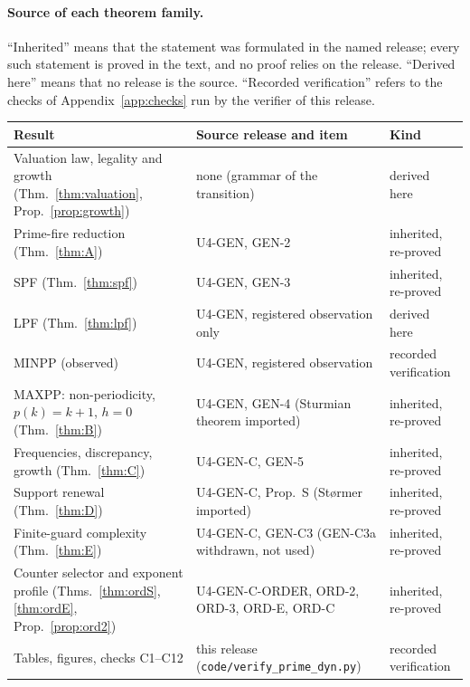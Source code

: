 \paragraph{Source of each theorem family.} ``Inherited'' means that the statement was formulated in the named release; every such statement is proved in the text, and no proof relies on the release. ``Derived here'' means that no release is the source. ``Recorded verification'' refers to the checks of Appendix~\ref{app:checks} run by the verifier of this release.
\begin{center}\scriptsize
\begin{tabular}{@{}p{}p{}p{}@{}}\toprule
Result & Source release and item & Kind\\\midrule
Valuation law, legality and growth (Thm.~\ref{thm:valuation}, Prop.~\ref{prop:growth}) & none (grammar of the transition) & derived here\\
Prime-fire reduction (Thm.~\ref{thm:A}) & U4-GEN, GEN-2 & inherited, re-proved\\
\textsf{SPF} (Thm.~\ref{thm:spf}) & U4-GEN, GEN-3 & inherited, re-proved\\
\textsf{LPF} (Thm.~\ref{thm:lpf}) & U4-GEN, registered observation only & derived here\\
\textsf{MINPP} (observed) & U4-GEN, registered observation & recorded verification\\
\textsf{MAXPP}: non-periodicity, $p(k)=k+1$, $h=0$ (Thm.~\ref{thm:B}) & U4-GEN, GEN-4 (Sturmian theorem imported) & inherited, re-proved\\
Frequencies, discrepancy, growth (Thm.~\ref{thm:C}) & U4-GEN-C, GEN-5 & inherited, re-proved\\
Support renewal (Thm.~\ref{thm:D}) & U4-GEN-C, Prop.~S (Størmer imported) & inherited, re-proved\\
Finite-guard complexity (Thm.~\ref{thm:E}) & U4-GEN-C, GEN-C3 (GEN-C3a withdrawn, not used) & inherited, re-proved\\
Counter selector and exponent profile (Thms.~\ref{thm:ordS}, \ref{thm:ordE}, Prop.~\ref{prop:ord2}) & U4-GEN-C-ORDER, ORD-2, ORD-3, ORD-E, ORD-C & inherited, re-proved\\
Tables, figures, checks C1--C12 & this release (\texttt{code/verify\_prime\_dyn.py}) & recorded verification\\
\bottomrule\end{tabular}\end{center}

